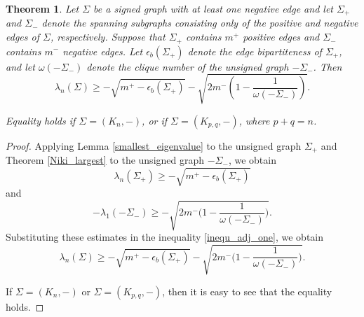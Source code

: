 \documentclass[12pt]{article}
\theoremstyle{plain}
\newtheorem{theorem}{Theorem}[section]
\numberwithin{equation}{section}
\begin{document}
		
		
		
	
	
	\begin{theorem}\label{adj_small_one}
		Let $\Sigma$ be a signed graph with at least one negative edge and let $\Sigma_{+}$ and $\Sigma_{-}$ denote the spanning subgraphs consisting only of the positive and negative edges of $\Sigma$, respectively. Suppose that $\Sigma_{+}$ contains $m^{+}$ positive edges and $\Sigma_{-}$ contains $m^{-}$ negative edges. Let $\epsilon_{b}(\Sigma_{+})$ denote the edge bipartiteness of $\Sigma_{+}$, and let $\omega(-\Sigma_{-})$ denote the clique number of the unsigned graph $-\Sigma_{-}$. Then
		\[
		\lambda_{n}(\Sigma)\geq -\sqrt{m^{+}-\epsilon_{b}(\Sigma_{+})}
		-\sqrt{2m^{-}\left(1-\frac{1}{\omega(-\Sigma_{-})}\right)}.
		\]
		
		Equality holds if $\Sigma=(K_{n},-)$,  or if $\Sigma=(K_{p,q},-)$, where $p+q=n$.
		
	\end{theorem}
	\begin{proof}
		
		Applying Lemma \ref{smallest_eigenvalue} to the unsigned graph $\Sigma_{+}$ and Theorem \ref{Niki_largest} to the unsigned graph $-\Sigma_{-}$, we obtain $$\lambda_{n}(\Sigma_{+})\geq -\sqrt{m^{+}-\epsilon_{b}(\Sigma_{+})}$$
		and $$-\lambda_{1}(-\Sigma_{-})\geq -\sqrt{2m^{-}\Big(1-\frac{1}{\omega(-\Sigma_{-})}\Big)}.$$
		Substituting these estimates in the inequality \eqref{inequ_adj_one}, we obtain
		\[\lambda_{n}(\Sigma)\geq  -\sqrt{m^{+}-\epsilon_{b}(\Sigma_{+})}-\sqrt{2m^{-}\Big(1-\frac{1}{\omega(-\Sigma_{-})}\Big)}.\]
		
		If $\Sigma=(K_{n}, -)$ or $\Sigma=(K_{p,q}, -)$, then it is easy to see that the equality holds.
	\end{proof}
	
\end{document}

